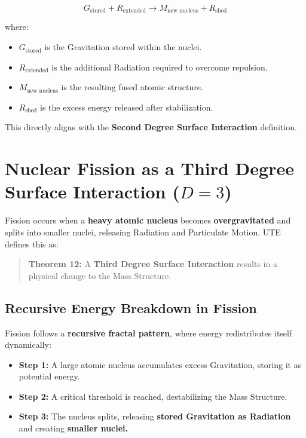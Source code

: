 \documentclass{article}
\begin{document}
\begin{equation}
    G_{\text{stored}} + R_{\text{extended}} \rightarrow M_{\text{new nucleus}} + R_{\text{shed}}
\end{equation}

where:
\begin{itemize}
    \item $G_{\text{stored}}$ is the Gravitation stored within the nuclei.
    \item $R_{\text{extended}}$ is the additional Radiation required to overcome repulsion.
    \item $M_{\text{new nucleus}}$ is the resulting fused atomic structure.
    \item $R_{\text{shed}}$ is the excess energy released after stabilization.
\end{itemize}

This directly aligns with the \textbf{Second Degree Surface Interaction} definition.

\section{Nuclear Fission as a Third Degree Surface Interaction ($D=3$)}
Fission occurs when a \textbf{heavy atomic nucleus} becomes \textbf{overgravitated} and splits into smaller nuclei, releasing Radiation and Particulate Motion. UTE defines this as:

\begin{quotation}
\textbf{Theorem 12:} A \textbf{Third Degree Surface Interaction} results in a physical change to the Mass Structure.
\end{quotation}

\subsection{Recursive Energy Breakdown in Fission}
Fission follows a \textbf{recursive fractal pattern}, where energy redistributes itself dynamically:
\begin{itemize}
    \item \textbf{Step 1:} A large atomic nucleus accumulates excess Gravitation, storing it as potential energy.
    \item \textbf{Step 2:} A critical threshold is reached, destabilizing the Mass Structure.
    \item \textbf{Step 3:} The nucleus splits, releasing \textbf{stored Gravitation as Radiation} and creating \textbf{smaller nuclei.}
\end{itemize}
\end{document}
